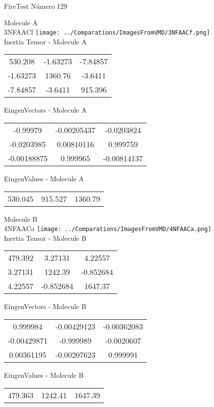 \vtab[-2cm]
\begin{center}
{\large FireTest \tab Número 129}
\end{center}
\begin{multicols}{2}
\begin{center}

Molecule A \\ 
3NFAACf
\texttt{[image: ../Comparations/ImagesFromVMD/3NFAACf.png]}
\\
Inertia Tensor - Molecule A \\
\vtab

\begin{tabular}{|c c c|}
530.208	 & 	-1.63273	 & 	-7.84857	 \\
-1.63273	 & 	1360.76	 & 	-3.6411	 \\
-7.84857	 & 	-3.6411	 & 	915.396
\end{tabular}

\vtab
 EingenVectors - Molecule A     \\
\vtab
\begin{tabular}{|c c c|}
-0.99979	 & 	-0.00205437	 & 	-0.0203824	 \\
-0.0203985	 & 	0.00810116	 & 	0.999759	 \\
-0.00188875	 & 	0.999965	 & 	-0.00814137
\end{tabular}

\vtab
 EingenValues - Molecule A     \\
\vtab
\begin{tabular}{|c c c|}
530.045	 & 	915.527	 & 	1360.79	 \\
\end{tabular}
\columnbreak

Molecule B \\ 
4NFAACa
\texttt{[image: ../Comparations/ImagesFromVMD/4NFAACa.png]}
\\
Inertia Tensor - Molecule B \\
\vtab

\begin{tabular}{|c c c|}
479.392	 & 	3.27131	 & 	4.22557	 \\
3.27131	 & 	1242.39	 & 	-0.852684	 \\
4.22557	 & 	-0.852684	 & 	1647.37
\end{tabular}

\vtab
 EingenVectors - Molecule B     \\
\vtab
\begin{tabular}{|c c c|}
0.999984	 & 	-0.00429123	 & 	-0.00362083	 \\
-0.00429871	 & 	-0.999989	 & 	-0.0020607	 \\
0.00361195	 & 	-0.00207623	 & 	0.999991
\end{tabular}

\vtab
 EingenValues - Molecule B     \\
\vtab
\begin{tabular}{|c c c|}
479.363	 & 	1242.41	 & 	1647.39	 \\
\end{tabular}

\end{center}
\end{multicols}
